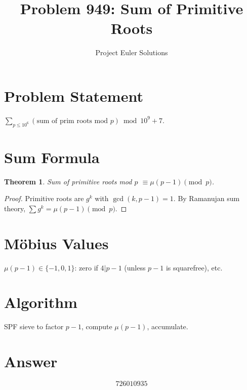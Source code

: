 \documentclass[11pt]{article}
\title{Problem 949: Sum of Primitive Roots}
\author{Project Euler Solutions}
\date{}
\newtheorem{theorem}{Theorem}
\theoremstyle{definition}
\begin{document}
\maketitle

\section{Problem Statement}
$\sum_{p \leq 10^6} (\text{sum of prim roots mod } p) \bmod 10^9+7$.

\section{Sum Formula}
\begin{theorem}
Sum of primitive roots mod $p$ $\equiv \mu(p-1) \pmod{p}$.
\end{theorem}

\begin{proof}
Primitive roots are $g^k$ with $\gcd(k,p-1)=1$. By Ramanujan sum theory, $\sum g^k = \mu(p-1) \pmod{p}$.
\end{proof}

\section{M\"obius Values}
$\mu(p-1) \in \{-1,0,1\}$: zero if $4|p-1$ (unless $p-1$ is squarefree), etc.

\section{Algorithm}
SPF sieve to factor $p-1$, compute $\mu(p-1)$, accumulate.

\section{Answer}

\[
\boxed{726010935}
\]
\end{document}
